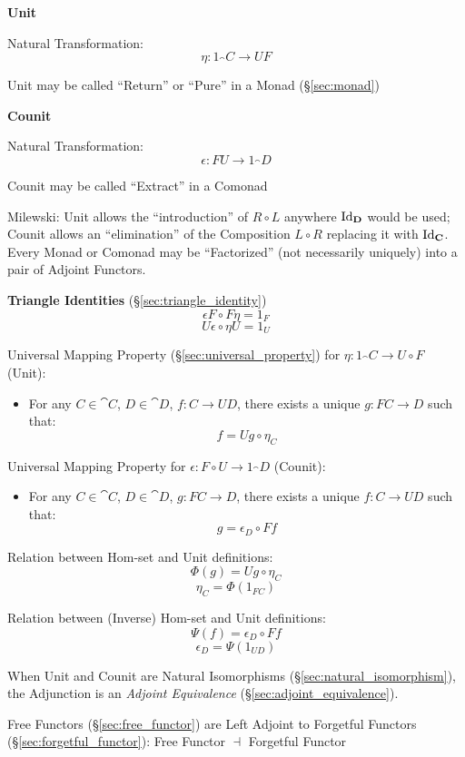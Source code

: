 \textbf{Unit}

Natural Transformation:
\[
  \eta : 1_\cat{C} \rightarrow U F
\]

\fist Unit may be called ``Return'' or ``Pure'' in a Monad
(\S\ref{sec:monad})


\textbf{Counit}

Natural Transformation:
\[
  \epsilon : F U \rightarrow 1_\cat{D}
\]

\fist Counit may be called ``Extract'' in a Comonad


Milewski: Unit allows the ``introduction'' of $R \circ L$ anywhere
$\mathrm{Id}_\mathbf{D}$ would be used; Counit allows an ``elimination'' of the
Composition $L \circ R$ replacing it with $\mathrm{Id}_\mathbf{C}$. Every Monad
or Comonad may be ``Factorized'' (not necessarily uniquely) into a
pair of Adjoint Functors.


\textbf{Triangle Identities} (\S\ref{sec:triangle_identity})
\[
  \epsilon F \circ F \eta = 1_F
\]\[
  U \epsilon \circ \eta U = 1_U
\]


Universal Mapping Property (\S\ref{sec:universal_property}) for $\eta
: 1_\cat{C} \rightarrow U \circ F$ (Unit):
\begin{itemize}
\item For any $C \in \cat{C}$, $D \in \cat{D}$, $f : C
  \rightarrow U D$, there exists a unique $g : FC \rightarrow D$ such
  that:
  \[
    f = U g \circ \eta_C
  \]
\end{itemize}

Universal Mapping Property for $\epsilon : F \circ U \rightarrow
1_\cat{D}$ (Counit):
\begin{itemize}
\item For any $C \in \cat{C}$, $D \in \cat{D}$, $g : F C
  \rightarrow D$, there exists a unique $f : C \rightarrow U D$ such
  that:
  \[
    g = \epsilon_D \circ F f
  \]
\end{itemize}

Relation between Hom-set and Unit definitions:
\[
  \Phi(g) = U g \circ \eta_C
\]\[
  \eta_C = \Phi(1_{FC})
\]

Relation between (Inverse) Hom-set and Unit definitions:
\[
  \Psi (f) = \epsilon_D \circ F f
\]\[
  \epsilon_D = \Psi(1_{U D})
\]

When Unit and Counit are Natural Isomorphisms
(\S\ref{sec:natural_isomorphism}), the Adjunction is an \emph{Adjoint
  Equivalence} (\S\ref{sec:adjoint_equivalence}).

Free Functors (\S\ref{sec:free_functor}) are Left Adjoint to Forgetful
Functors (\S\ref{sec:forgetful_functor}): Free Functor $\dashv$
Forgetful Functor

